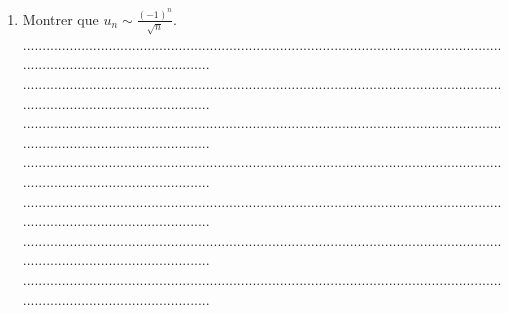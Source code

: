 \documentclass{article}
\begin{document}
\begin{footnotesize}
\begin{enumerate}
    ...........................................................................................................................................................................\newline
    ...........................................................................................................................................................................\newline
    ...........................................................................................................................................................................\newline
    ...........................................................................................................................................................................\newline\newline
    \item Montrer que $u_{n}\sim \frac{(-1)^{n}}{\sqrt{n}}$.\newline\newline
    ...........................................................................................................................................................................\newline
    ...........................................................................................................................................................................\newline
    ...........................................................................................................................................................................\newline
    ...........................................................................................................................................................................\newline
    ...........................................................................................................................................................................\newline
    ...........................................................................................................................................................................\newline
    ...........................................................................................................................................................................\newline

\end{enumerate}
\end{footnotesize}
\end{document}
